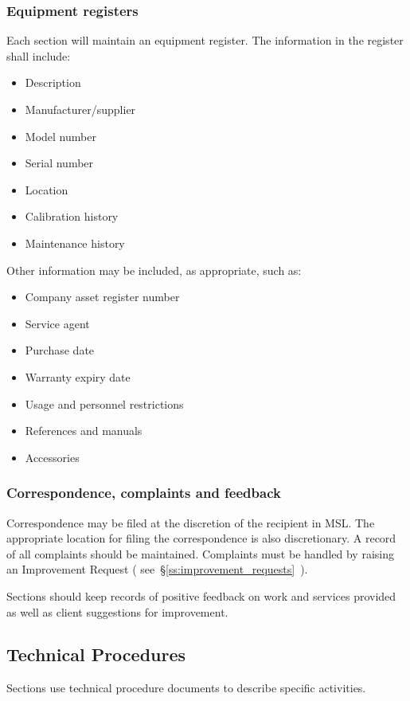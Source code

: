 \subsubsection{Equipment registers}
\label{sss:equipment_register}
Each section will maintain an equipment register. The information in the register shall include: 
\begin{itemize}
\item Description 

\item Manufacturer/supplier 
\item Model number 
\item Serial number 
\item Location
\item Calibration history 
\item Maintenance history
\end{itemize}
Other information may be included, as appropriate, such as:
\begin{itemize}\item Company asset register number 
\item Service agent 
\item Purchase date 
\item Warranty expiry date 
\item Usage and personnel restrictions
\item References and manuals
\item Accessories
\end{itemize}

\subsubsection{Correspondence, complaints and feedback}
Correspondence may be filed at the discretion of the recipient in MSL. The appropriate location for filing the correspondence is also discretionary. 
A record of all complaints should be maintained. Complaints must be handled by raising an Improvement Request ( see~\S\ref{ss:improvement_requests}~).

Sections should keep records of positive feedback on work and services provided as well as client suggestions for improvement.

\subsection{Technical Procedures}
\label{ss:technical_procedures}
Sections use technical procedure documents to describe specific activities.

